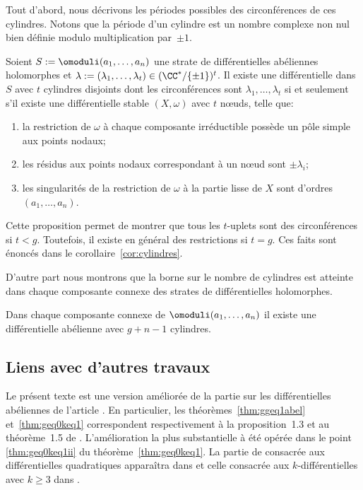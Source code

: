 Tout d'abord, nous décrivons les périodes possibles des circonférences de ces cylindres. Notons que la période d'un cylindre est un nombre complexe non nul bien définie modulo multiplication par~$\pm 1$.
\begin{prop}\label{prop:cylindres}
Soient $S:=\omoduli(a_{1},\dots,a_{n})$ une strate de différentielles abéliennes holomorphes et $\lambda:=(\lambda_{1},\dots,\lambda_{t})\in (\CC^{\ast}/\{\pm1\})^{t}$.
Il existe une différentielle dans $S$ avec $t$ cylindres disjoints dont les circonférences sont $\lambda_{1},\dots,\lambda_{t}$ si et seulement s'il existe une
différentielle stable $(X,\omega)$ avec $t$ nœuds, telle que:
\begin{enumerate}
\item la restriction de $\omega$ à chaque composante irréductible possède un pôle simple aux points nodaux;
\item les résidus aux points nodaux correspondant à un nœud sont $\pm \lambda_{i}$;
\item les singularités de la restriction de $\omega$ à la partie lisse de $X$ sont d'ordres $(a_{1},\dots,a_{n})$.
\end{enumerate}
\end{prop}
Cette proposition permet de montrer que tous les $t$-uplets sont des circonférences si $t<g$. Toutefois, il existe en général des restrictions si $t=g$. Ces faits sont énoncés dans le corollaire~\ref{cor:cylindres}.

D'autre part nous montrons que la borne sur le nombre de cylindres est atteinte dans chaque composante connexe des strates de différentielles holomorphes.
\begin{prop}\label{prop:cylcc}
Dans chaque composante connexe de $\omoduli(a_{1},\dots,a_{n})$ il existe une différentielle abélienne avec $g+n-1$ cylindres.
\end{prop}

\subsection{Liens avec d'autres travaux}
\label{sec:travauxintro}

Le présent texte est une version améliorée de la partie sur les différentielles abéliennes de l'article \cite{geta}. En particulier, les théorèmes~\ref{thm:ggeq1abel} et~\ref{thm:geq0keq1} correspondent respectivement à la proposition~1.3 et au théorème~1.5 de \cite{geta}. L'amélioration la plus substantielle à été opérée dans le point \eqref{thm:geq0keq1ii} du théorème~\ref{thm:geq0keq1}. La partie de \cite{geta} consacrée aux différentielles quadratiques apparaîtra dans \cite{getaquad} et celle consacrée aux $k$-différentielles avec $k\geq 3$ dans \cite{getakdiff}.

